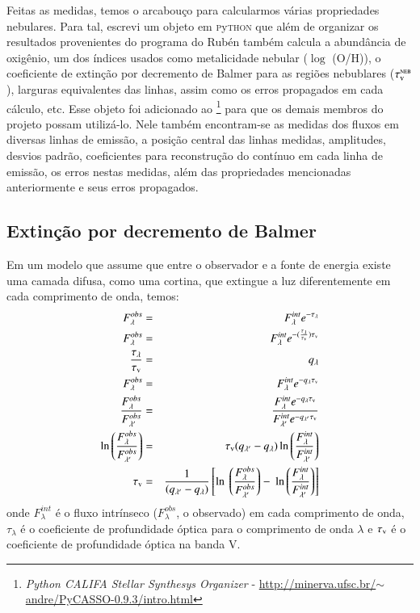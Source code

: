 Feitas as medidas, temos o arcabouço para calcularmos várias propriedades nebulares. Para tal,
escrevi um objeto em \textsc{p}y\textsc{thon} que além de organizar os resultados provenientes do
programa do Rubén também calcula a abundância de oxigênio, um dos índices usados como metalicidade
nebular ($\log$ (O/H)), o coeficiente de extinção por decremento de Balmer para as regiões
nebublares ($\tau_{\mathrm{\textsc{v}}}^{\mathrm{\textsc{neb}}}$), larguras equivalentes das linhas, assim como os erros propagados em cada
cálculo, etc. Esse objeto foi adicionado ao \pycasso\footnote{
	{\em Python CALIFA Stellar Synthesys Organizer} -
\href{
	http://minerva.ufsc.br/~andre/PyCASSO-0.9.3/intro.html
}{
	http://minerva.ufsc.br/$\sim$andre/PyCASSO-0.9.3/intro.html}
}
\citep{CidFernandes.etal.2013a} para que os demais membros do projeto possam utilizá-lo. Nele também
encontram-se as medidas dos fluxos em diversas linhas de emissão, a posição central das linhas
medidas, amplitudes, desvios padrão, coeficientes para reconstrução do contínuo em cada linha de
emissão, os erros nestas medidas, além das propriedades mencionadas anteriormente e seus erros
propagados.

\subsection{Extinção por decremento de Balmer}
\label{sec:emline:datacube:tauvneb}

Em um modelo que assume que entre o observador e a fonte de energia existe uma camada difusa, como
uma cortina, que extingue a luz diferentemente em cada comprimento de onda, temos:
\begin{eqnarray}
   F_\lambda^{obs} &=& F_\lambda^{int} e^{-\tau_\lambda} \\
   F_\lambda^{obs} &=& F_\lambda^{int} e^{-(\frac{\tau_\lambda}{\tauV}) \tauV} \\
   \frac{\tau_\lambda}{\tauV} &=& q_\lambda \\
   F_\lambda^{obs} &=& F_\lambda^{int} e^{-q_\lambda \tauV} \\
   \frac{F_\lambda^{obs}}{F_{\lambda^\prime}^{obs}} &=& \
 \frac{F_\lambda^{int} e^{-q_\lambda \tauV}}{F_{\lambda^\prime}^{int} e^{-q_{\lambda^\prime} \tauV}} \\
   \ln \left(\frac{F_\lambda^{obs}}{F_{\lambda^\prime}^{obs}}\right) &=& \
 \tauV (q_{\lambda^\prime} - q_\lambda) \ln \left(\frac{F_\lambda^{int}}{F_{\lambda^\prime}^{int}}\right) \\
   \tauV &=& \frac{1}{(q_{\lambda^\prime} - q_\lambda)} \left[\ln \ 
 \left(\frac{F_\lambda^{obs}}{F_{\lambda^\prime}^{obs}}\right) - \
 \ln \left(\frac{F_\lambda^{int}}{F_{\lambda^\prime}^{int}}\right)\right] 
\end{eqnarray}
\noindent onde $F_\lambda^{int}$ é o fluxo intrínseco ($F_\lambda^{obs}$, o observado) em cada
comprimento de onda, $\tau_\lambda$ é o coeficiente de profundidade óptica para o comprimento de
onda $\lambda$ e $\tau_{\mathrm{\textsc{v}}}$ é o coeficiente de profundidade óptica na banda V.


